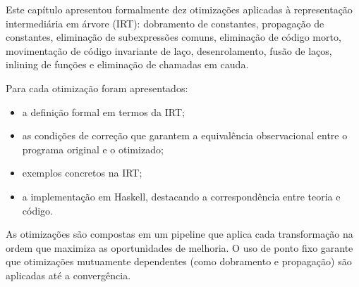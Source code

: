 Este capítulo apresentou formalmente dez otimizações aplicadas à representação
intermediária em árvore (IRT): dobramento de constantes, propagação de
constantes, eliminação de subexpressões comuns, eliminação de código morto,
movimentação de código invariante de laço, desenrolamento, fusão de laços,
inlining de funções e eliminação de chamadas em cauda.

Para cada otimização foram apresentados:
\begin{itemize}
  \item a definição formal em termos da IRT;
  \item as condições de correção que garantem a equivalência observacional
    entre o programa original e o otimizado;
  \item exemplos concretos na IRT;
  \item a implementação em Haskell, destacando a correspondência entre
    teoria e código.
\end{itemize}

As otimizações são compostas em um pipeline que aplica cada transformação na
ordem que maximiza as oportunidades de melhoria.  O uso de ponto fixo garante
que otimizações mutuamente dependentes (como dobramento e propagação) são
aplicadas até a convergência.
